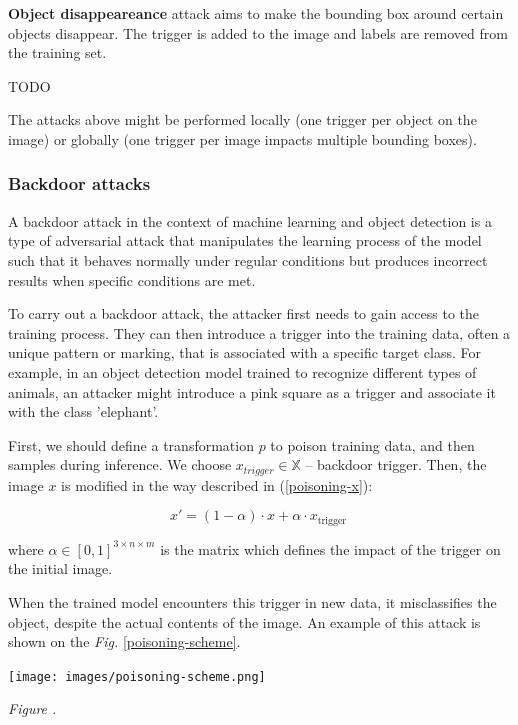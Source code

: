 \documentclass[14pt,a4paper]{extarticle}
\newcounter{e}
\newcounter{pic}
\newcommand{\pic}[1]{\refstepcounter{pic} \vspace{-0.3cm}\textit{Figure \arabic{pic}\label{#1}.}}
\numberwithin{equation}{section}
\numberwithin{figure}{section}
\begin{document}
\textbf{Object disappeareance} attack aims to make the bounding box around certain objects disappear. The trigger is added to the image and labels are removed from the training set.

TODO

The attacks above might be performed locally (one trigger per object on the image) or globally (one trigger per image impacts multiple bounding boxes).


\subsubsection{Backdoor attacks}
A backdoor attack in the context of machine learning and object detection is a type of adversarial attack that manipulates the learning process of the model such that it behaves normally under regular conditions but produces incorrect results when specific conditions are met.

To carry out a backdoor attack, the attacker first needs to gain access to the training process. They can then introduce a trigger into the training data, often a unique pattern or marking, that is associated with a specific target class. For example, in an object detection model trained to recognize different types of animals, an attacker might introduce a pink square as a trigger and associate it with the class 'elephant'.

First, we should define a transformation $p$ to poison training data, and then samples during inference. We choose $x_{trigger} \in \mathbb{X}$ -- backdoor trigger. Then, the image $x$ is modified in the way described in (\ref{poisoning-x}): 

\begin{equation}
\label{poisoning-x}
    x'= (1-\alpha) \cdot x + \alpha \cdot x_{\text {trigger }}
\end{equation}

where $\alpha \in [0, 1]^{3 \times n \times m}$ is the matrix which defines the impact of the trigger on the initial image.

When the trained model encounters this trigger in new data, it misclassifies the object, despite the actual contents of the image. An example of this attack is shown on the \textit{Fig.} \ref{poisoning-scheme}.

\begin{center}
    \texttt{[image: images/poisoning-scheme.png]}
\end{center}
\begin{center}
    \pic{poisoning-scheme} 
\end{center}
\end{document}
